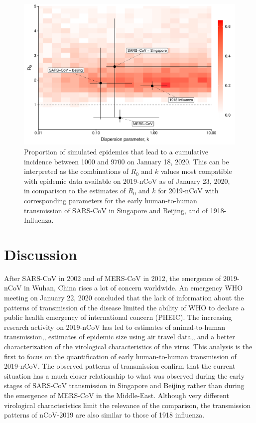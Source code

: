 \documentclass{article}
\begin{document}
\begin{figure}[h]
	\centering
	\includegraphics[width=.9\linewidth]{../figure/fig1.pdf}
	\caption{Proportion of simulated epidemics that lead to a cumulative incidence between 1000 and 9700 on January 18, 2020. This can be interpreted as the combinations of $R_0$ and $k$ values most compatible with epidemic data available on 2019-nCoV as of January 23, 2020, in comparison to the estimates of $R_0$ and $k$ for 2019-nCoV with corresponding parameters for the early human-to-human transmission of SARS-CoV in Singapore and Beijing, and of 1918-Influenza.\cite{Lloyd-Smith:2005,Fraser:2011,Kucharski:2015b}
	}
	\label{fig:fig1}
\end{figure}


\section{Discussion}

After SARS-CoV in 2002 and of MERS-CoV in 2012, the emergence of 2019-nCoV in Wuhan, China rises a lot of concern worldwide.
An emergency WHO meeting on January 22, 2020 concluded that the lack of information about the patterns of transmission of the disease limited the ability of WHO to declare a public health emergency of international concern (PHEIC).\cite{whoreco}
The increasing research activity on 2019-nCoV has led to estimates of animal-to-human transmission,\cite{Chen2020.01.19.911669}, estimates of epidemic size using air travel data,\cite{Imai:2020, vespi:2020}, and a better characterization of the virological characteristics of the virus.\cite{Shi:2020}
This analysis is the first to focus on the quantification of early human-to-human transmission of 2019-nCoV.
The observed patterns of transmission confirm that the current situation has a much closer relationship to what was observed during the early stages of SARS-CoV transmission in Singapore and Beijing rather than during the emergence of MERS-CoV in the Middle-East.\cite{Lloyd-Smith:2005,Kucharski:2015b}
Although very different virological characteristics limit the relevance of the comparison, the transmission patterns of nCoV-2019 are also similar to those of 1918 influenza.
\end{document}
